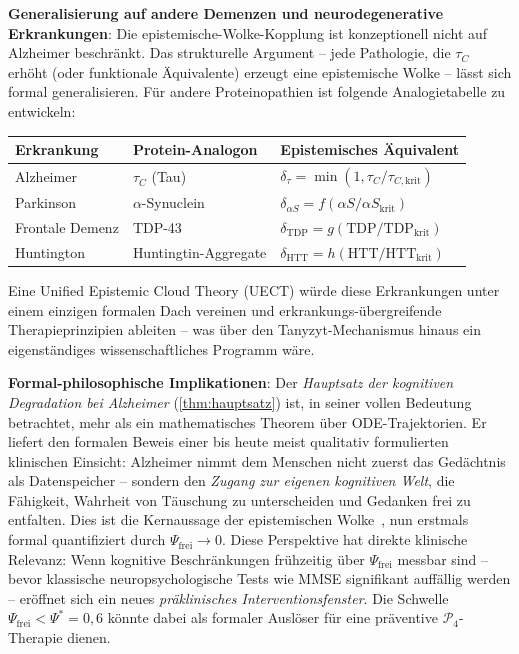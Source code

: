﻿\documentclass[12pt,a4paper]{article}
\theoremstyle{definition}
\begin{document}
	\textbf{Generalisierung auf andere Demenzen und neurodegenerative Erkrankungen}:
	Die epistemische-Wolke-Kopplung ist konzeptionell nicht auf Alzheimer beschränkt. Das strukturelle Argument -- jede Pathologie, die $\tau_C$ erhöht (oder funktionale Äquivalente) erzeugt eine epistemische Wolke -- lässt sich formal generalisieren. Für andere Proteinopathien ist folgende Analogietabelle zu entwickeln:
	\begin{center}
	\small
	\begin{tabular}{lll}
		\hline
		\textbf{Erkrankung} & \textbf{Protein-Analogon} & \textbf{Epistemisches Äquivalent} \\
		\hline
		Alzheimer & $\tau_C$ (Tau) & $\delta_\tau = \min(1, \tau_C/\tau_{C,\mathrm{krit}})$ \\
		Parkinson & $\alpha$-Synuclein & $\delta_{\alpha S} = f(\alpha S / \alpha S_{\mathrm{krit}})$ \\
		Frontale Demenz & TDP-43 & $\delta_{\mathrm{TDP}} = g(\mathrm{TDP}/\mathrm{TDP}_{\mathrm{krit}})$ \\
		Huntington & Huntingtin-Aggregate & $\delta_{\mathrm{HTT}} = h(\mathrm{HTT}/\mathrm{HTT}_{\mathrm{krit}})$ \\
		\hline
	\end{tabular}
	\end{center}
	Eine Unified Epistemic Cloud Theory (UECT) würde diese Erkrankungen unter einem einzigen formalen Dach vereinen und erkrankungs-übergreifende Therapieprinzipien ableiten -- was über den Tanyzyt-Mechanismus hinaus ein eigenständiges wissenschaftliches Programm wäre.

	\textbf{Formal-philosophische Implikationen}:
	Der \emph{Hauptsatz der kognitiven Degradation bei Alzheimer} (\cref{thm:hauptsatz}) ist, in seiner vollen Bedeutung betrachtet, mehr als ein mathematisches Theorem über ODE-Trajektorien. Er liefert den formalen Beweis einer bis heute meist qualitativ formulierten klinischen Einsicht: Alzheimer nimmt dem Menschen nicht zuerst das Gedächtnis als Datenspeicher -- sondern den \emph{Zugang zur eigenen kognitiven Welt}, die Fähigkeit, Wahrheit von Täuschung zu unterscheiden und Gedanken frei zu entfalten. Dies ist die Kernaussage der epistemischen Wolke~\cite{Epp2026brn}, nun erstmals formal quantifiziert durch $\Psi_{\mathrm{frei}} \to 0$.
	Diese Perspektive hat direkte klinische Relevanz: Wenn kognitive Beschränkungen frühzeitig über $\Psi_{\mathrm{frei}}$ messbar sind -- bevor klassische neuropsychologische Tests wie MMSE signifikant auffällig werden -- eröffnet sich ein neues \emph{präklinisches Interventionsfenster}. Die Schwelle $\Psi_{\mathrm{frei}} < \Psi^* = 0{,}6$ könnte dabei als formaler Auslöser für eine präventive $\mathcal{P}_4$-Therapie dienen.
\end{document}
